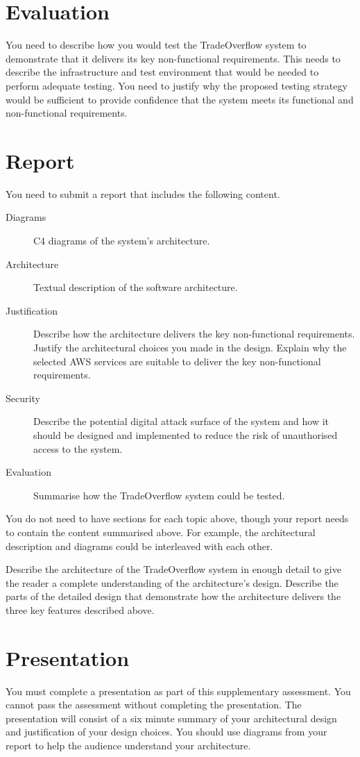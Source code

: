 \documentclass{csse4400}
\begin{document}
\section{Evaluation}
You need to describe how you would test the TradeOverflow system to demonstrate that it delivers its key non-functional requirements.
This needs to describe the infrastructure and test environment that would be needed to perform adequate testing.
You need to justify why the proposed testing strategy would be sufficient to provide confidence that the system meets its functional and non-functional requirements.


\section{Report}
You need to submit a report that includes the following content.
\begin{description}
    \item[Diagrams] C4 diagrams of the system's architecture.
    \item[Architecture] Textual description of the software architecture.
    \item[Justification] Describe how the architecture delivers the key non-functional requirements. Justify the architectural choices you made in the design. Explain why the selected AWS services are suitable to deliver the key non-functional requirements.
    \item[Security] Describe the potential digital attack surface of the system and how it should be designed and implemented to reduce the risk of unauthorised access to the system.
    \item[Evaluation] Summarise how the TradeOverflow system could be tested.
\end{description}
You do not need to have sections for each topic above, though your report needs to contain the content summarised above.
For example, the architectural description and diagrams could be interleaved with each other.

Describe the architecture of the TradeOverflow system in enough detail
to give the reader a complete understanding of the architecture's design.
Describe the parts of the detailed design that demonstrate how the architecture delivers the three key features described above.


\section{Presentation}
You must complete a presentation as part of this supplementary assessment.
You cannot pass the assessment without completing the presentation.
The presentation will consist of a six minute summary of your architectural design and justification of your design choices.
You should use diagrams from your report to help the audience understand your architecture.
\end{document}
